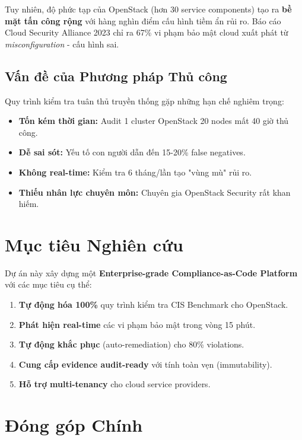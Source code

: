 \documentclass[12pt,a4paper]{report}
\begin{document}
Tuy nhiên, độ phức tạp của OpenStack (hơn 30 service components) tạo ra \textbf{bề mặt tấn công rộng} với hàng nghìn điểm cấu hình tiềm ẩn rủi ro. Báo cáo Cloud Security Alliance 2023 chỉ ra 67\% vi phạm bảo mật cloud xuất phát từ \textit{misconfiguration} - cấu hình sai.

\subsection{Vấn đề của Phương pháp Thủ công}

Quy trình kiểm tra tuân thủ truyền thống gặp những hạn chế nghiêm trọng:

\begin{itemize}
    \item \textbf{Tốn kém thời gian:} Audit 1 cluster OpenStack 20 nodes mất 40 giờ thủ công.
    \item \textbf{Dễ sai sót:} Yếu tố con người dẫn đến 15-20\% false negatives.
    \item \textbf{Không real-time:} Kiểm tra 6 tháng/lần tạo "vùng mù" rủi ro.
    \item \textbf{Thiếu nhân lực chuyên môn:} Chuyên gia OpenStack Security rất khan hiếm.
\end{itemize}

\section{Mục tiêu Nghiên cứu}

Dự án này xây dựng một \textbf{Enterprise-grade Compliance-as-Code Platform} với các mục tiêu cụ thể:

\begin{enumerate}
    \item \textbf{Tự động hóa 100\%} quy trình kiểm tra CIS Benchmark cho OpenStack.
    \item \textbf{Phát hiện real-time} các vi phạm bảo mật trong vòng 15 phút.
    \item \textbf{Tự động khắc phục} (auto-remediation) cho 80\% violations.
    \item \textbf{Cung cấp evidence audit-ready} với tính toàn vẹn (immutability).
    \item \textbf{Hỗ trợ multi-tenancy} cho cloud service providers.
\end{enumerate}

\section{Đóng góp Chính}
\end{document}
